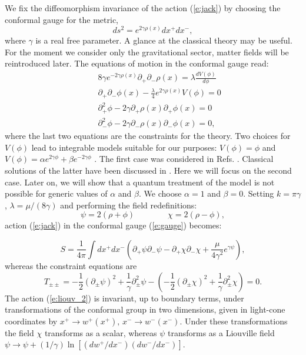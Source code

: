 \documentclass[a4paper,aps,prd,twocolumn,groupedaddress]{revtex4}
\begin{document}
We fix the diffeomorphism invariance of the action (\ref{e:jack}) by
choosing the conformal gauge for the metric,
\begin{equation}\label{e:gauge}
ds^{2}= e^{2\gamma\rho(x)} dx^{+}dx^{-},
\end{equation}
where $\gamma$ is a real free parameter.  A glance at the classical
theory may be useful. For the moment we consider only the
gravitational sector, matter fields will be  reintroduced
later. The equations of motion in the conformal gauge read:
\begin{eqnarray*}
&& 8\gamma e^{-2\gamma\rho(x)}\partial_+\partial_-\rho(x)=\lambda
\frac{dV(\phi)}{d\phi} \\
&& \partial_+\partial_-\phi(x)
-\frac{\lambda}{4}e^{2\gamma\rho(x)}V(\phi)=0 \\
&& \partial_+^2\phi -2\gamma\partial_+\rho(x)\partial_+\phi(x)=0\\
&& \partial_-^2\phi -2\gamma\partial_-\rho(x)\partial_-\phi(x)=0,
\end{eqnarray*}
where the last two equations are the constraints for the theory. Two
choices for $V(\phi)$ lead to integrable models suitable for our
purposes: $V(\phi)=\phi$ and $V(\phi)=\alpha e^{2\gamma\phi}+\beta
e^{-2\gamma\phi}$ \cite{fil}. The first case was considered in Refs.
\cite{jack2,jack}. Classical solutions of the latter have been
discussed in \cite{FN}. Here we will focus on the second case.  Later
on, we will show that a quantum treatment of the model is not possible
for generic values of $\alpha$ and $\beta$.  We choose $\alpha=1$ and
$\beta=0$. Setting $k=\pi\gamma$, $\lambda=\mu/(8\gamma)$ and
performing the field redefinitions:
\begin{displaymath}
\psi = 2(\rho+\phi) \qquad \qquad \chi = 2(\rho-\phi),
\end{displaymath}
action (\ref{e:jack}) in the conformal gauge (\ref{e:gauge}) becomes:

\begin{equation}\label{e:liouv_2}S = \frac{1}{4\pi}\int dx^+dx^- \left(
\partial_+\psi\partial_-\psi
-\partial_+\chi\partial_-\chi
+\frac{\mu}{4\gamma^2}e^{\gamma\psi} \right),
\end{equation}
whereas the constraint equations are
\begin{equation}\label{e:constr_1}
T_{\pm\pm} = -\frac{1}{2}(\partial_\pm\psi)^2 +
\frac{1}{\gamma}\partial^2_\pm\psi - (-\frac{1}{2}(\partial_\pm\chi)^2
+ \frac{1}{\gamma}\partial^2_\pm\chi) =0.
\end{equation}
The action (\ref{e:liouv_2}) is invariant, up to boundary terms, under
transformations of the conformal group in two dimensions, given in
light-cone coordinates by $x^+\to w^+(x^+),\, x^- \to w^-(x^-)$. Under
these transformations the field $\chi$ transforms as a scalar, whereas
$\psi$ transforms as a Liouville field $\psi\to\psi +(1/\gamma)\ln
[(dw^+/dx^-)(dw^-/dx^-)]$.
\end{document}
